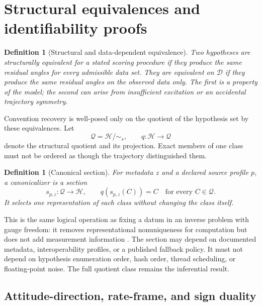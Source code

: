 \documentclass[11pt]{article}
\newtheorem{definition}[theorem]{Definition}
\begin{document}
    \section{Structural equivalences and identifiability proofs}\label{app:identifiability}

    \begin{definition}[Structural and data-dependent equivalence]
Two hypotheses are structurally equivalent for a stated scoring procedure if they
produce the same residual angles for every admissible data set. They are equivalent on
$\mathcal D$ if they produce the same residual angles on the observed data only. The
first is a property of the model; the second can arise from insufficient excitation or
an accidental trajectory symmetry.
    \end{definition}

    Convention recovery is well-posed only on the quotient of the hypothesis set by these
    equivalences. Let
    \begin{equation}
        \mathcal Q=\mathcal H/{\sim_s},
        \qquad
        q:\mathcal H\rightarrow\mathcal Q
    \end{equation}
    denote the structural quotient and its projection. Exact members of one class must not
    be ordered as though the trajectory distinguished them.

    \begin{definition}[Canonical section]
For metadata $z$ and a declared source profile $p$, a canonicalizer is a section
\begin{equation}
    s_{p,z}:\mathcal Q\rightarrow\mathcal H,
    \qquad
    q\!\left(s_{p,z}(C)\right)=C
    \quad\text{for every }C\in\mathcal Q.
    \label{eq:canonical-section}
\end{equation}
It selects one representation of each class without changing the class itself.
    \end{definition}

    This is the same logical operation as fixing a datum in an inverse problem with gauge
    freedom: it removes representational nonuniqueness for computation but does not add
    measurement information \cite{triggs2000}. The section may depend on documented metadata,
    interoperability profiles, or a published fallback policy. It must not depend on
    hypothesis enumeration order, hash order, thread scheduling, or floating-point noise.
    The full quotient class remains the inferential result.

    \subsection{Attitude-direction, rate-frame, and sign duality}
\end{document}
